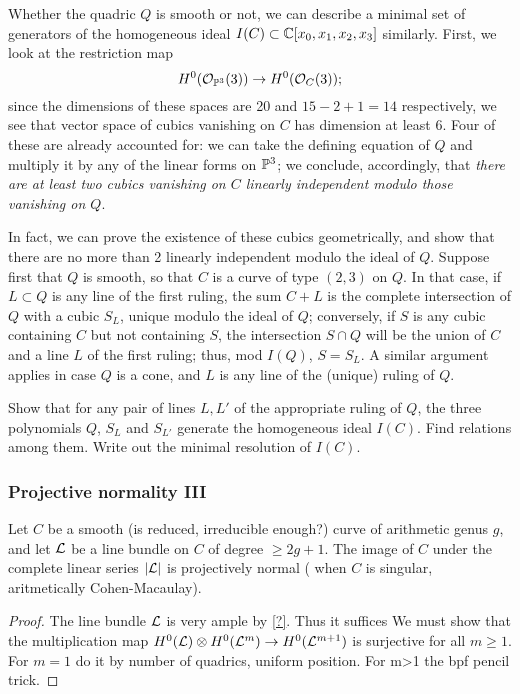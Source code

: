 Whether the quadric $Q$ is smooth or not, we can describe a minimal set of generators of the homogeneous ideal $I(C) \subset \CC[x_0, x_1, x_2, x_3]$ similarly. First, we look at the restriction map
$$
H^0(\cO_{\PP^3}(3)) \to H^0(\cO_C(3));
$$
since the dimensions of these spaces are 20 and $15-2+1 = 14$ respectively, we see that  vector space of cubics vanishing on $C$ has dimension at least 6. Four of these are already accounted for: we can take the defining equation of $Q$ and multiply it by any of the linear forms on $\PP^3$; we conclude, accordingly, that \emph{there are at least two cubics vanishing on $C$ linearly independent modulo those vanishing on $Q$}.

In fact, we can prove the existence of these cubics geometrically, and show that there are no more than 2 linearly independent modulo the ideal of $Q$. Suppose first that $Q$ is smooth, so that $C$ is a curve of type $(2,3)$ on $Q$. In that case, if $L \subset Q$ is any line of the first ruling, the sum $C+L$ is the complete intersection of $Q$ with a cubic $S_L$, unique modulo the ideal of $Q$; conversely, if $S$ is any cubic containing $C$ but not containing $S$, the intersection $S \cap Q$ will be the union of $C$ and a line $L$ of the first ruling; thus, mod $I(Q)$, $S = S_L$. A similar argument applies in case $Q$ is a cone, and $L$ is any line of the (unique) ruling of $Q$.

\begin{exercise}
Show that for any pair of lines $L, L'$ of the appropriate ruling of $Q$, the three polynomials $Q$, $S_L$ and $S_{L'}$ generate the homogeneous ideal $I(C)$. Find relations among them. Write out the minimal resolution of $I(C)$.
\end{exercise}

\subsubsection{Projective normality III}

\begin{theorem}
 Let $C$ be a smooth (is reduced, irreducible enough?) curve of arithmetic genus $g$, and let $\cL$ be a line bundle on $C$ of degree $\geq 2g+1$. The image of 
 $C$ under the complete linear series $|\cL|$ is projectively normal ( when $C$ is singular, aritmetically Cohen-Macaulay).
\end{theorem}

\begin{proof}
 The line bundle $\cL$ is very ample by \ref{?}. Thus it suffices We must show that the multiplication map $H^0(\sL)\otimes H^0(\cL^{m}) \to H^0(\cL^{m+1})$ is surjective for all $m\geq 1$.
 For $m=1$ do it by number of quadrics, uniform position. For m>1 the bpf pencil trick.
\end{proof}


